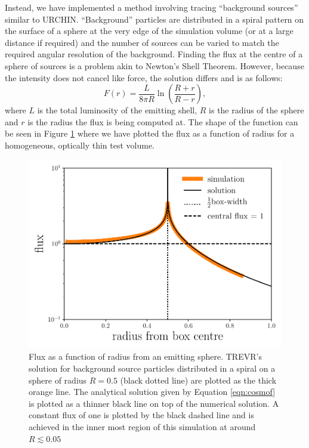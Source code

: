 \documentclass[fleq,usenatbib]{mnras}
\newcommand{\acro}{TREVR}
\begin{document}
Instead, we have implemented a method involving tracing ``background sources'' 
similar to URCHIN. ``Background'' particles are distributed in a spiral 
pattern on the surface of a sphere at the very edge of the simulation volume 
(or at a large distance if required) and the number of sources can be varied 
to match the required angular resolution of the background. Finding the flux 
at the centre of a sphere of sources is a problem akin to Newton's Shell 
Theorem. However, because the intensity does not cancel like force, the 
solution differs and is as follows:
\begin{equation}
\label{eqn:cosmof}
F(r) = \frac{L}{8\pi R} \ln \left(\frac{R+r}{R-r}\right),
\end{equation}
where $L$ is the total luminosity of the emitting shell, $R$ is the radius of 
the sphere and $r$ is the radius the flux is being computed at. The shape of 
the function can be seen in Figure \ref{fig:cosmof} where we have plotted the 
flux as a function of radius for a homogeneous, optically thin test volume.
\begin{figure}
\includegraphics[width=1\linewidth]{Figures/cosmofield.pdf}
\caption{Flux as a function of radius from an emitting sphere. \acro{}'s 
solution for background source particles distributed in a spiral on a sphere 
of radius $R=0.5$ (black dotted line) are plotted as the thick orange line. 
The analytical solution given by Equation \ref{eqn:cosmof} is plotted as a 
thinner black line on top of the numerical solution. A constant flux of one is 
plotted by the black dashed line and is achieved in the inner most region of 
this simulation at around $R \lesssim 0.05$}
\label{fig:cosmof}
\end{figure}
\end{document}
